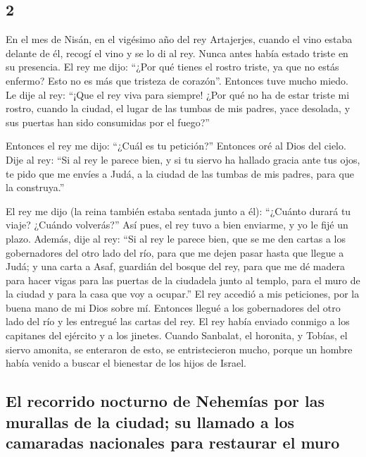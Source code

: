 \begin{paracol}{2}
\hypertarget{section-2}{%
\section{2}\label{section-2}}

 En el mes de Nisán, en el vigésimo año del rey
Artajerjes, cuando el vino estaba delante de él, recogí el vino y se lo
di al rey. Nunca antes había estado triste en su presencia.
 El rey me dijo: ``¿Por qué tienes el rostro triste, ya
que no estás enfermo? Esto no es más que tristeza de corazón''. Entonces
tuve mucho miedo.  Le dije al rey: ``¡Que el rey viva para
siempre! ¿Por qué no ha de estar triste mi rostro, cuando la ciudad, el
lugar de las tumbas de mis padres, yace desolada, y sus puertas han sido
consumidas por el fuego?''

 Entonces el rey me dijo: ``¿Cuál es tu petición?''
Entonces oré al Dios del cielo.  Dije al rey: ``Si al rey
le parece bien, y si tu siervo ha hallado gracia ante tus ojos, te pido
que me envíes a Judá, a la ciudad de las tumbas de mis padres, para que
la construya.''

 El rey me dijo (la reina también estaba sentada junto a
él): ``¿Cuánto durará tu viaje? ¿Cuándo volverás?'' Así pues, el rey
tuvo a bien enviarme, y yo le fijé un plazo.  Además, dije
al rey: ``Si al rey le parece bien, que se me den cartas a los
gobernadores del otro lado del río, para que me dejen pasar hasta que
llegue a Judá;  y una carta a Asaf, guardián del bosque
del rey, para que me dé madera para hacer vigas para las puertas de la
ciudadela junto al templo, para el muro de la ciudad y para la casa que
voy a ocupar.'' El rey accedió a mis peticiones, por la buena mano de mi
Dios sobre mí.  Entonces llegué a los gobernadores del
otro lado del río y les entregué las cartas del rey. El rey había
enviado conmigo a los capitanes del ejército y a los jinetes.
 Cuando Sanbalat, el horonita, y Tobías, el siervo
amonita, se enteraron de esto, se entristecieron mucho, porque un hombre
había venido a buscar el bienestar de los hijos de Israel.

\hypertarget{el-recorrido-nocturno-de-nehemuxedas-por-las-murallas-de-la-ciudad-su-llamado-a-los-camaradas-nacionales-para-restaurar-el-muro}{%
\subsection{El recorrido nocturno de Nehemías por las murallas de la
ciudad; su llamado a los camaradas nacionales para restaurar el
muro}\label{el-recorrido-nocturno-de-nehemuxedas-por-las-murallas-de-la-ciudad-su-llamado-a-los-camaradas-nacionales-para-restaurar-el-muro}}


\end{paracol}
